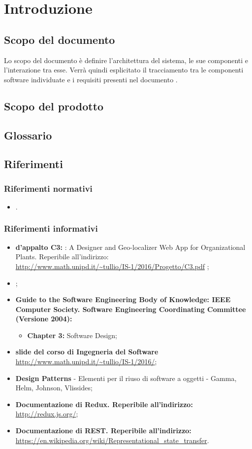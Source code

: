 \newpage
\section{Introduzione}
	\subsection {Scopo del documento}
	Lo scopo del documento è definire l'architettura del sistema, le sue componenti e l'interazione tra esse. Verrà quindi esplicitato il tracciamento tra le componenti software individuate e i requisiti presenti nel documento \adrv.
	\subsection {Scopo del prodotto}
	\introScopo
	\subsection {Glossario}
	\introGlossario
	\subsection {Riferimenti}
	\subsubsection{Riferimenti normativi}
	\begin{itemize}
		\item \ndpv.
	\end{itemize}
	\subsubsection{Riferimenti informativi}
	\begin{itemize}
		\item \textbf{ d'appalto C3:} \progetto: A Designer and Geo-localizer Web App for Organizational Plants. Reperibile all'indirizzo:\\ \url{http://www.math.unipd.it/~tullio/IS-1/2016/Progetto/C3.pdf} ;
		\item \adrv;
		\item \textbf{Guide to the Software Engineering Body of Knowledge: IEEE Computer Society. Software Engineering Coordinating Committee (Versione 2004):}
		\begin{itemize}
			\item \textbf{Chapter 3:} Software Design;
		\end{itemize}
		\item \textbf{slide del corso di Ingegneria del Software}\\
		\url{http://www.math.unipd.it/~tullio/IS-1/2016/};
		\item \textbf{Design Patterns} - Elementi per il riuso di software a oggetti - Gamma, Helm, Johnson, Vlissides;
		\item \textbf{Documentazione di Redux. Reperibile all'indirizzo: \\}\url{http://redux.js.org/};
			\item \textbf{Documentazione di REST. Reperibile all'indirizzo: \\}\url{https://en.wikipedia.org/wiki/Representational_state_transfer}.
	\end{itemize}
